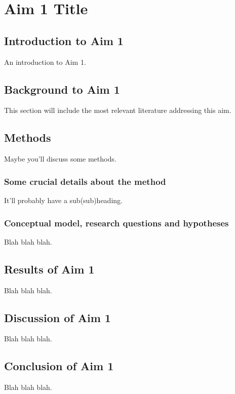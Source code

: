 \center

\section{Aim 1 Title}

\raggedright

\subsection{Introduction to Aim 1}
An introduction to Aim 1.

\subsection{Background to Aim 1}
This section will include the most relevant literature addressing this
aim. 

\subsection{Methods}
Maybe you'll discuss some methods.

\subsubsection{Some crucial details about the method}
It'll probably have a sub(sub)heading.

\subsubsection{Conceptual model, research questions and hypotheses}
Blah blah blah.

\subsection{Results of Aim 1}
Blah blah blah.

\subsection{Discussion of Aim 1}
Blah blah blah.

\subsection{Conclusion of Aim 1}
Blah blah blah.